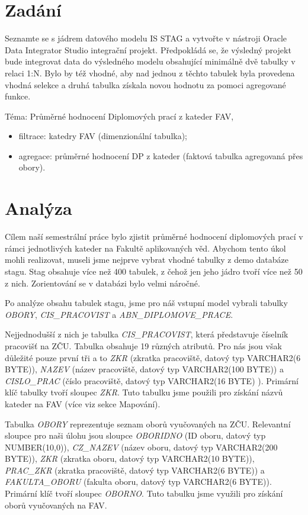 \section{Zadání}

Seznamte se s jádrem datového modelu IS STAG a vytvořte v nástroji Oracle Data Integrator Studio integrační projekt.
Předpokládá se, že výsledný projekt bude integrovat data do výsledného modelu obsahující minimálně dvě tabulky v relaci 1:N.
Bylo by též vhodné, aby nad jednou z těchto tabulek byla provedena vhodná selekce a druhá tabulka získala novou hodnotu za pomoci agregované funkce.

Téma: Průměrné hodnocení Diplomových prací z kateder FAV,

\begin{itemize}
    \item filtrace: katedry FAV (dimenzionální tabulka);
    \item agregace: průměrné hodnocení DP z kateder (faktová tabulka agregovaná přes obory).
\end{itemize}

\section{Analýza}
Cílem naší semestrální práce bylo zjistit průměrné hodnocení diplomových prací v rámci jednotlivých kateder na Fakultě aplikovaných věd. Abychom tento úkol mohli realizovat, museli jsme nejprve vybrat vhodné tabulky z demo databáze stagu. Stag obsahuje více než 400 tabulek, z čehož jen jeho jádro tvoří více než 50 z nich. Zorientování se v databázi bylo velmi náročné. 

Po analýze obsahu tabulek stagu, jsme pro náš vstupní model vybrali tabulky \textit{OBORY}, \textit{CIS\_PRACOVIST} a \textit{ABN\_DIPLOMOVE\_PRACE}. 

Nejjednodušší z nich je tabulka \textit{CIS\_PRACOVIST}, která představuje číselník pracovišť na ZČU.
Tabulka obsahuje 19 různých atributů.
Pro nás jsou však důležité pouze první tři a to \textit{ZKR} (zkratka pracoviště, datový typ VARCHAR2(6 BYTE)), \textit{NAZEV} (název pracoviště, datový typ VARCHAR2(100 BYTE)) a \textit{CISLO\_PRAC} (číslo pracoviště, datový typ VARCHAR2(16 BYTE) ).
Primární klíč tabulky tvoří sloupec \textit{ZKR}.
Tuto tabulku jsme použili pro získání názvů kateder na FAV (více viz sekce Mapování). 

Tabulka \textit{OBORY} reprezentuje seznam oborů vyučovaných na ZČU.
Relevantní sloupce pro naši úlohu jsou sloupce \textit{OBORIDNO} (ID oboru, datový typ NUMBER(10,0)), \textit{CZ\_NAZEV} (název oboru, datový typ VARCHAR2(200 BYTE)), \textit{ZKR} (zkratka oboru, datový typ VARCHAR2(10 BYTE)), \textit{PRAC\_ZKR} (zkratka pracoviště, datový typ VARCHAR2(6 BYTE)) a \textit{FAKULTA\_OBORU} (fakulta oboru, datový typ VARCHAR2(6 BYTE)). Primární klíč tvoří sloupec \textit{OBORNO}. Tuto tabulku jsme využili pro získání oborů vyučovaných na FAV. 

